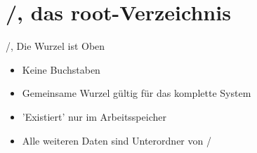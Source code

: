 \section[/]{/, das root-Verzeichnis}
\begin{frame}{/, Die Wurzel ist Oben}
\begin{itemize}
\item Keine Buchstaben
\item Gemeinsame Wurzel gültig für das komplette System
\item 'Existiert' nur im Arbeitsspeicher
\item Alle weiteren Daten sind Unterordner von /
\end{itemize}
\end{frame}